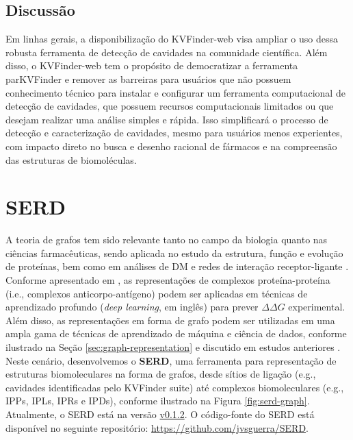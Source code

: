 \documentclass[Portugues]{phdquali}
\def\ie{i.e.\onedot}
\def\eg{e.g.\onedot}
\begin{document}
\subsection{Discussão}

Em linhas gerais, a disponibilização do KVFinder-web visa ampliar o uso dessa robusta ferramenta de detecção de cavidades na comunidade científica. Além disso, o KVFinder-web tem o propósito de democratizar a ferramenta parKVFinder e remover as barreiras para usuários que não possuem conhecimento técnico para instalar e configurar um ferramenta computacional de detecção de cavidades, que possuem recursos computacionais limitados ou que desejam realizar uma análise simples e rápida. Isso simplificará o processo de detecção e caracterização de cavidades, mesmo para usuários menos experientes, com impacto direto no busca e desenho racional de fármacos e na compreensão das estruturas de biomoléculas.

\section{SERD \label{sec:serd}}

A teoria de grafos tem sido relevante tanto no campo da biologia quanto nas ciências farmacêuticas, sendo aplicada no estudo da estrutura, função e evolução de proteínas, bem como em análises de DM e redes de interação receptor-ligante \cite{vishveshwara2002,mason2007,hummer2023}. Conforme apresentado em \cite{hummer2023}, as representações de complexos proteína-proteína (\ie, complexos anticorpo-antígeno) podem ser aplicadas em técnicas de aprendizado profundo (\textit{deep learning}, em inglês) para prever $\Delta \Delta G$ experimental. Além disso, as representações em forma de grafo podem ser utilizadas em uma ampla gama de técnicas de aprendizado de máquina e ciência de dados, conforme ilustrado na Seção \ref{sec:graph-representation} e discutido em estudos anteriores \cite{majeed2020,vishveshwara2002,mason2007}. Neste cenário, desenvolvemos o \textbf{SERD}, uma ferramenta para representação de estruturas biomoleculares na forma de grafos, desde sítios de ligação (\eg, cavidades identificadas pelo KVFinder suite) até complexos biomoleculares (\eg, IPPs, IPLs, IPRs e IPDs), conforme ilustrado na Figura \ref{fig:serd-graph}. Atualmente, o SERD está na versão \href{https://github.com/jvsguerra/SERD/tree/v0.1.2}{v0.1.2}. O código-fonte do SERD está disponível no seguinte repositório: \url{https://github.com/jvsguerra/SERD}.
\end{document}

